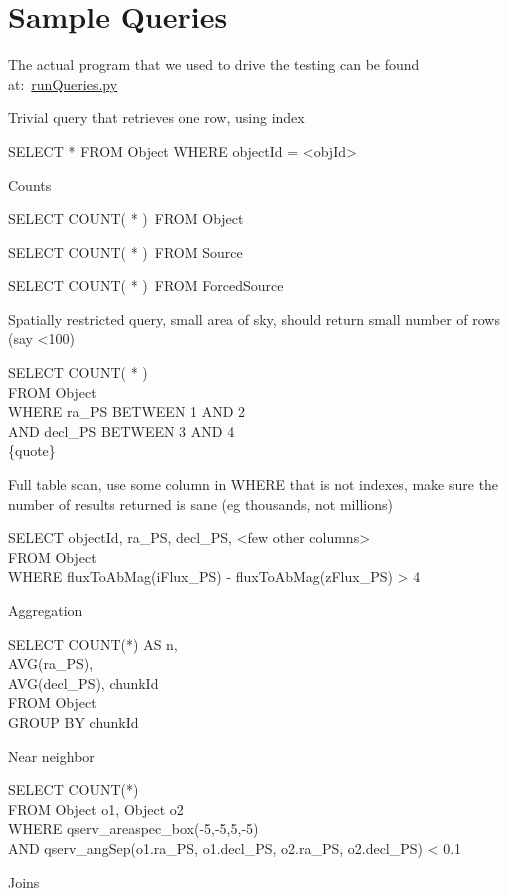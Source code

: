 \documentclass[DM,toc]{lsstdoc}
\begin{document}
\section{Sample Queries}\label{sample-queries}

The actual program that we used to drive the testing can be found
at:~\href{https://github.com/lsst-dm/db_tests_summer15/blob/tickets/DM-3364/DM-3364/runQueries.py}{runQueries.py}

Trivial query that retrieves one row, using index

SELECT * FROM Object WHERE objectId = \textless{}objId\textgreater{}

Counts

SELECT COUNT( * )~FROM Object

SELECT COUNT( * )~FROM Source

SELECT COUNT( * )~FROM ForcedSource

Spatially restricted query, small area of sky, should return small
number of rows (say \textless{}100)

SELECT COUNT( * )\\
FROM Object\\
WHERE ra\_PS BETWEEN 1 AND 2\\
AND decl\_PS BETWEEN 3 AND 4\\
\{quote\}

Full table scan, use some column in WHERE that is not indexes, make sure
the number of results returned is sane (eg thousands, not millions)

SELECT objectId, ra\_PS, decl\_PS, \textless{}few other
columns\textgreater{}\\
FROM Object\\
WHERE fluxToAbMag(iFlux\_PS) - fluxToAbMag(zFlux\_PS) \textgreater{} 4

Aggregation

SELECT COUNT(*) AS n,\\
AVG(ra\_PS),\\
AVG(decl\_PS), chunkId\\
FROM Object\\
GROUP BY chunkId

Near neighbor

SELECT COUNT(*)\\
FROM Object o1, Object o2\\
WHERE qserv\_areaspec\_box(-5,-5,5,-5)\\
AND qserv\_angSep(o1.ra\_PS, o1.decl\_PS, o2.ra\_PS, o2.decl\_PS)
\textless{} 0.1

Joins
\end{document}
